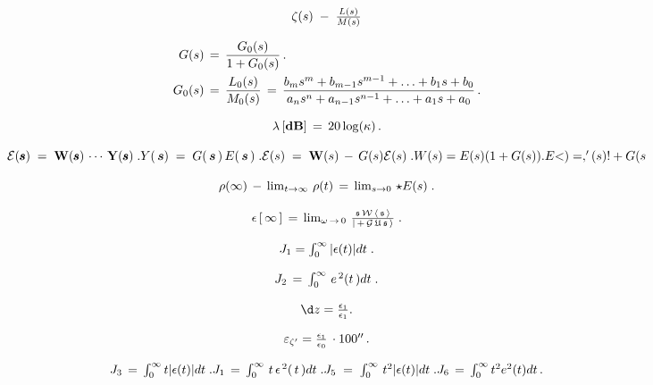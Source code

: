 \documentclass{article}
\begin{document}
\[
$$
\zeta( s ) \;-\; \frac{L ( s )} {M ( s )}
$$
\]

\[
$$
\begin{aligned} {G ( s )} & {{} \,=\, \frac{G_{0} ( s )} {1+G_{0} ( s )} \,.} \\ {G_{0} ( s )} & {{} \,=\, \frac{L_{0} ( s )} {M_{0} ( s )} \,=\, \frac{b_{m} s^{m}+b_{m-1} s^{m-1}+\ldots+b_{1} s+b_{0}} {a_{n} s^{n}+a_{n-1} s^{n-1}+\ldots+a_{1} s+a_{0}} \,.} \\ \end{aligned}
$$
\]

\[
$$
\lambda\left[ {\bf d B} \right] \,=\, 2 0 \operatorname{l o g} ( \kappa) \,.
$$
\]

\[
$$
{\cal E} ( {\pmb s} ) \;=\; {\mathbf W} ( {\pmb s} ) \, \cdots\, {\mathbf Y} ( {\pmb s} ) \;.
$$
$$
Y ( \, \boldsymbol{s} ) \;=\; G ( \, \boldsymbol{s} \, ) \, E ( \, \boldsymbol{s} \, ) \;.
$$
$$
{\cal E} ( s ) \;=\; {\bf W} ( s ) \,-\, G ( s ) {\cal E} ( s ) \;.
$$
W(s)= E(s)(1+G(s)). E{<)=,'(s)
!+G(s}
\]

\[
$$
\rho( \infty) \,-\, \operatorname* {l i m}_{t \to\infty} \, \rho( t ) \,=\, \operatorname* {l i m}_{s \to0} \, \star E ( s ) \;.
$$
\]

\[
$$
\epsilon\, [ \, \infty\, ] \,=\, \operatorname* {l i m}_{\omega\, \to\, 0} \, \frac{\mathfrak{s} \, \mathcal{W} \, \langle\, \mathfrak{s} \, \rangle} {\mid\,+\, \mathcal{G} \, \mathfrak{U} \, \mathfrak{s} \, \rangle} \;.
$$
\]

\[
$$
J_{1}=\int_{0}^{\infty} | \epsilon( t ) | d t \;.
$$
\]

\[
$$
J_{2} \,=\, \int_{0}^{\infty} \, e^{\, 2} ( t \, ) d t \;.
$$
\]

\[
$$
\d z=\frac{\epsilon_{1}} {\epsilon_{1}}.
$$
\]

\[
$$
\varepsilon_{\zeta^{\prime}}=\frac{\epsilon_{1}} {\epsilon_{0}} \, \cdot1 0 0^{\prime\prime} \,.
$$
\]

\[
$$
J_{3} \,=\, \int_{0}^{\infty} t | \epsilon( t ) | d t \;.
$$
$$
J_{1} \,=\, \int_{0}^{\infty} \, t \, \epsilon^{\, 2} ( \, t \, ) d t \;.
$$
$$
J_{5} \;=\; \int_{0}^{\infty} \, t^{2} | \epsilon( t ) | d t \;.
$$
$$
J_{6} \,=\, \int_{0}^{\infty} t^{2} e^{2} ( t ) d t \,.
$$
\]
\end{document}
